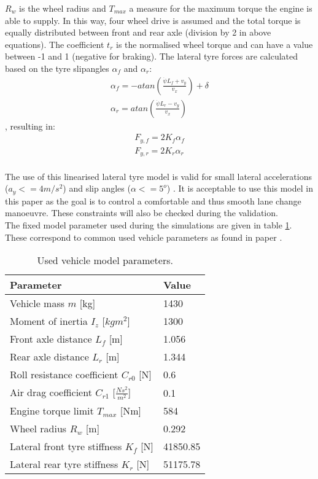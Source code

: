 $R_w$ is the wheel radius and $T_{max}$ a measure for the maximum torque the engine is able to supply. In this way, four wheel drive is assumed and the total torque is equally distributed between front and rear axle (division by 2 in above equations). The coefficient $t_r$ is the normalised wheel torque and can have a value between -1 and 1 (negative for braking).
The lateral tyre forces are calculated based on the tyre slipangles $\alpha_f$ and $\alpha_r$:
\begin{equation}\label{eq:bicycle_slipangle}
\begin{aligned}
\alpha_f = -atan(\frac{\dot{\psi} L_f + v_y}{v_x}) + \delta\\
\alpha_r = atan(\frac{\dot{\psi} L_r - v_y}{v_x})
\end{aligned}
\end{equation},
resulting in:
\begin{equation}\label{eq:bicycle_Fy}
\begin{aligned}
F_{y,f} = 2 K_f \alpha_f\\
F_{y,r} = 2 K_r \alpha_r
\end{aligned}
\end{equation}\\
The use of this linearised lateral tyre model is valid for small lateral accelerations ($a_y <= 4 m/s^2$) and slip angles ($\alpha <= 5^o$) \cite{TongDuySon2019}. It is acceptable to use this model in this paper as the goal is to control a comfortable and thus smooth lane change manoeuvre. These constraints will also be checked during the validation.\\

The fixed model parameter used during the simulations are given in table \ref{table:vehicel_model_param}. These correspond to common used vehicle parameters as found in paper \cite{Yankov}.

\begin{table}[h]
	\centering
	\begin{tabular}{|p{5cm}|p{2cm}|}
		\hline
		\textbf{Parameter} & \textbf{Value}\\ \hline		
		Vehicle mass $m$ [kg] & 1430\\ \hline
		Moment of inertia $I_z$ [$kgm^2$] & 1300\\ \hline
		Front axle distance $L_f$ [m] & 1.056\\ \hline
		Rear axle distance $L_r$ [m] & 1.344\\ \hline
		Roll resistance coefficient $C_{r0}$ [N] & 0.6\\ \hline
		Air drag coefficient $C_{r1}$ [$\frac{Ns^2}{m^2}$] & 0.1\\ \hline
		Engine torque limit $T_{max}$ [Nm] & 584\\ \hline
		Wheel radius $R_w$ [m] & 0.292\\ \hline
		Lateral front tyre stiffness $K_{f}$ [N] & 41850.85\\ \hline
		Lateral rear tyre stiffness $K_{r}$ [N] & 51175.78\\ \hline
		
	\end{tabular}
	\caption{Used vehicle model parameters.}
	\label{table:vehicel_model_param}
\end{table}

